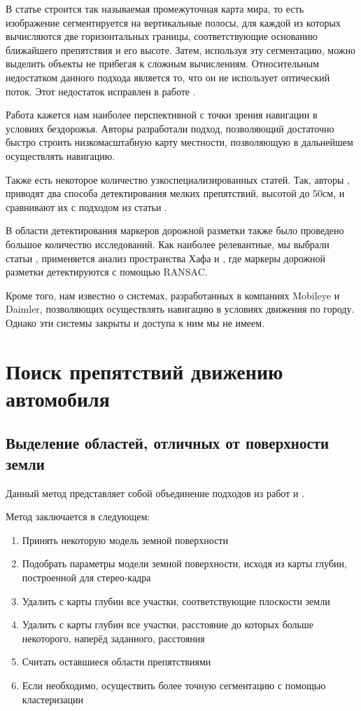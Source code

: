 \documentclass[aps,%
14pt,%
final,%
oneside,
onecolumn,%
musixtex, %
superscriptaddress,%
centertags]{extarticle} %
\begin{document}
В статье \cite{pfeiffer2010efficient} строится так называемая промежуточная карта мира, то есть изображение сегментируется на вертикальные полосы, для каждой из которых вычисляются две горизонтальных границы, соответствующие основанию ближайшего препятствия и его высоте. Затем, используя эту сегментацию, можно выделить объекты не прибегая к сложным вычислениям. Относительным недостатком данного подхода является то, что он не использует оптический поток. Этот недостаток исправлен в работе \cite{benenson2011stixels}.

Работа \cite{broggi2013terrain} кажется нам наиболее перспективной с точки зрения навигации в условиях бездорожья. Авторы разработали подход, позволяющий достаточно быстро строить низкомасштабную карту местности, позволяющую в дальнейшем осуществлять навигацию.

Также есть некоторое количество узкоспециализированных статей. Так, авторы \cite{pinggera2016lost}, приводят два способа детектирования мелких препятствий, высотой до 50см, и сравнивают их с подходом из статьи \cite{pfeiffer2010efficient}.

В области детектирования маркеров дорожной разметки также было проведено большое количество исследований. Как наиболее релевантные, мы выбрали статьи \cite{song2017real}, применяется анализ пространства Хафа и \cite{aly2008real}, где маркеры дорожной разметки детектируются с помощью RANSAC. 

Кроме того, нам известно о системах, разработанных в компаниях Mobileye и Daimler, позволяющих осуществлять навигацию в условиях движения по городу. Однако эти системы закрыты и доступа к ним мы не имеем.

\section {Поиск препятствий движению автомобиля }

\subsection{Выделение областей, отличных от поверхности земли }

Данный метод представляет собой объединение подходов из работ \cite{labayrade2002real} и \cite{broggi2006single}.

Метод заключается в следующем:
\begin{enumerate}
    \item Принять некоторую модель земной поверхности
    \item Подобрать параметры модели земной поверхности, исходя из карты глубин, построенной для стерео-кадра
    \item Удалить с карты глубин все участки, соответствующие плоскости земли
    \item Удалить с карты глубин все участки, расстояние до которых больше некоторого, наперёд заданного, расстояния
    \item Считать оставшиеся области препятствиями
    \item Если необходимо, осуществить более точную сегментацию с помощью кластеризации
\end{enumerate}
\end{document}

